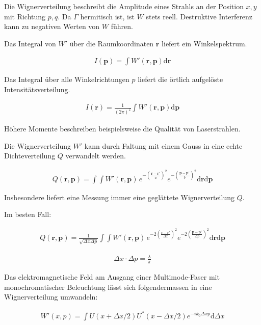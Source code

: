 \documentclass{article}
\newcommand{\vect}[1]{\mathbf{#1}}
\renewcommand{\r}{\vect r}
\newcommand{\p}{\vect p}
\begin{document}
Die Wignerverteilung beschreibt die Amplitude eines Strahls an der
Position $x, y$ mit Richtung $p, q$. Da $\Gamma$ hermitisch ist, ist
$W$ stets reell. Destruktive Interferenz kann zu negativen Werten von
$W$ f\"uhren.

Das Integral von $W'$ \"uber die Raumkoordinaten $\r$ liefert ein
Winkelspektrum.

\begin{align}
  I(\p) = \int W'(\r,\p) \textrm{d}\r
\end{align}

Das Integral \"uber alle Winkelrichtungen $p$ liefert
die \"ortlich aufgel\"oste Intensit\"atsverteilung.

\begin{align}
  I(\r) = \frac{1}{(2\pi)^2} \int W'(\r,\p) \textrm{d}\p
\end{align}

H\"ohere Momente beschreiben beispielsweise die Qualit\"at von
Laserstrahlen.

Die Wignerverteilung $W'$ kann durch Faltung mit einem Gauss in eine
echte Dichteverteilung $Q$ verwandelt werden.

\begin{align}
  Q(\r,\p) = \int\int W'(\r,\p)\, e^{-\left(\frac{\r-\r'}{a}\right)^2} e^{-\left(\frac{\p-\p'}{b}\right)^2}\textrm{d}\r\textrm{d}\p
\end{align}

Insbesondere liefert eine Messung immer eine gegl\"attete
Wignerverteilung $Q$.


Im besten Fall: 

\begin{align}
  Q(\r,\p) = \frac{1}{\sqrt{\Delta x \Delta p }}\int\int W'(\r,\p)\, e^{-2 \left(\frac{\r-\r'}{\Delta x}\right)^2} e^{- 2 \left(\frac{\p-\p'}{\Delta p}\right)^2}\textrm{d}\r\textrm{d}\p
\end{align}

\begin{align}
  \Delta x \cdot \Delta p = \frac{\lambda}{\pi}
\end{align}

Das elektromagnetische Feld am Ausgang einer Multimode-Faser mit
monochromatischer Beleuchtung l\"asst sich folgendermassen in eine
Wignerverteilung umwandeln:

\begin{align}
  W'(x,p) = \int U(x+\Delta x/2) U^*(x-\Delta x/2) e^{-i k_0 \Delta x p}\textrm{d}\Delta x
\end{align}
\end{document}
